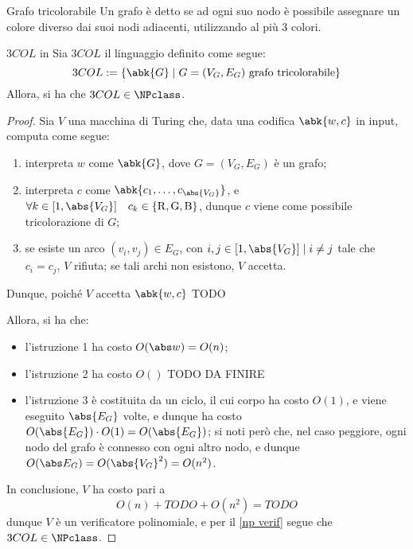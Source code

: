 \documentclass[a4paper, 12pt]{report}
\begin{document}
    \begin{frameddefn}{Grafo tricolorabile}
        Un grafo è detto  se ad ogni suo nodo è possibile assegnare un colore diverso dai suoi nodi adiacenti, utilizzando al più 3 colori.
    \end{frameddefn}

    \begin{framedthm}{$3COL$ in \NPclass}
        Sia $3COL$ il linguaggio definito come segue: $$3COL := \{\abk{G} \mid G = (V_G, E_G) \ \textrm{grafo tricolorabile}\}$$ Allora, si ha che $3COL \in \NPclass$.
    \end{framedthm}

    \begin{proof}
        Sia $V$ una macchina di Turing che, data una codifica $\abk{w, c}$ in input, computa come segue:

        \begin{enumerate}
            \item interpreta $w$ come $\abk{G}$, dove $G = (V_G, E_G)$ è un grafo;
            \item interpreta $c$ come $\abk{c_1, \ldots, c_{\abs{V_G}}}$, e $\forall k \in [1, \abs{V_G}] \quad c_k \in \{\mathrm R, \mathrm G, \mathrm B\}$, dunque $c$ viene come possibile tricolorazione di $G$;
            \item se esiste un arco $(v_i, v_j) \in E_G$, con $i, j \in [1, \abs{V_G}] \mid i \neq j$ tale che $c_i = c_j$, $V$ rifiuta; se tali archi non esistono, $V$ accetta.
        \end{enumerate}

        Dunque, poiché $V$ accetta $\abk{w, c}$ TODO

        Allora, si ha che:

        \begin{itemize}
            \item l'istruzione 1 ha costo $O(\abs w) = O(n)$;
            \item l'istruzione 2 ha costo $O()$ TODO DA FINIRE
            \item l'istruzione 3 è costituita da un ciclo, il cui corpo ha costo $O(1)$, e viene eseguito $\abs{E_G}$ volte, e dunque ha costo $O(\abs{E_G}) \cdot O(1) = O(\abs{E_G})$; si noti però che, nel caso peggiore, ogni nodo del grafo è connesso con ogni altro nodo, e dunque $O(\abs E_G) = O(\abs{V_G}^2) = O(n^2)$.
        \end{itemize}

        In conclusione, $V$ ha costo pari a $$O(n) + TODO + O(n^2) = TODO$$ dunque $V$ è un verificatore polinomiale, e per il \cref{np verif} segue che $3COL \in \NPclass$.
    \end{proof}
\end{document}
